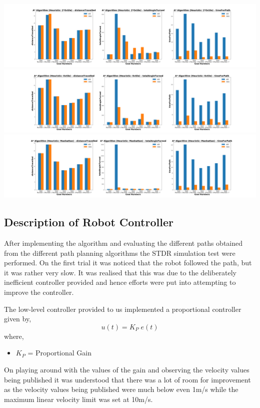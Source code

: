 \documentclass[a4paper,12pt]{article}
\begin{document}
			\includegraphics[scale=0.18]{images/compare_robot_A_Algorithm_Heuristic_2Octile.png}
			\includegraphics[scale=0.18]{images/compare_robot_A_Algorithm_Heuristic_Octile.png}
			\includegraphics[scale=0.18]{images/compare_robot_A_Algorithm_Heuristic_Manhattan.png}
		\subsection{Description of Robot Controller}
		After implementing the algorithm and evaluating the different paths obtained from the different path planning algorithms the STDR simulation test were performed. On the first trial it was noticed that the robot followed the path, but it was rather very slow. It was realised that this was due to the deliberately inefficient controller provided and hence efforts were put into attempting to improve the controller.
		
		The low-level controller provided to us implemented a proportional controller given by,
		\begin{equation}
		u(t)=K_P \; e(t)
		\end{equation}
		where,
		\begin{itemize}
			\item $K_P$ = Proportional Gain
		\end{itemize}
		On playing around with the values of the gain and observing the velocity values being published it was understood that there was a lot of room for improvement as the velocity values being published were much below even 1m/s while the maximum linear velocity limit was set at 10m/s.
		
\end{document}

